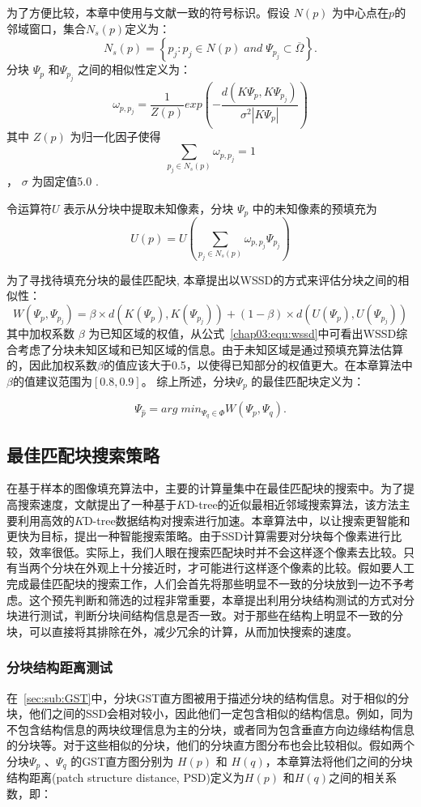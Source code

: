  为了方便比较，本章中使用与文献一致的符号标识。假设 \(N(p)\) 为中心点在\(p\)的邻域窗口，集合\(N_s(p)\)定义为：
 $$N_s(p)= \left\{ p_j:p_j \in N(p)\;and\;\Psi_{p_j} \subset \overline{\Omega} \right\}.$$
 分块 \(\Psi_p\) 和\(\Psi_{p_j}\)  之间的相似性定义为：
 $$\omega_{p,p_{j}}=\frac{1}{Z(p)}exp\left(-\frac{d(K\Psi_p,K\Psi_{p_j})}{\sigma^2\left|K\Psi_p\right|}\right)$$
 其中 \(Z(p)\) 为归一化因子使得 $$\sum_{p_j\in N_s(p)}\omega_{p,p_j} = 1$$ ， \(\sigma\) 为固定值5.0 \cite{Xu:2010}.\par
 令运算符\(U\) 表示从分块中提取未知像素，分块 \(\Psi_p\) 中的未知像素的预填充为
 $$U(p)=U\left(\sum_{p_j \in N_s(p)}{\omega_{p,p_j}\Psi_{p_j}}\right)$$\par
 为了寻找待填充分块的最佳匹配块, 本章提出以WSSD的方式来评估分块之间的相似性：
 \begin{equation}
 W(\Psi_p,\Psi_{p_j})=\beta\times d(K(\Psi_p),K(\Psi_{p_j}))+(1-\beta)\times d(U(\Psi_p),U(\Psi_{p_j}))
 \label{chap03:equ:wssd}
 \end{equation}
 其中加权系数 \(\beta\) 为已知区域的权值，从公式~\ref{chap03:equ:wssd}中可看出WSSD综合考虑了分块未知区域和已知区域的信息。由于未知区域是通过预填充算法估算的，因此加权系数\(\beta\)的值应该大于0.5，以使得已知部分的权值更大。在本章算法中 \(\beta\)的值建议范围为$[0.8, 0.9]$。 综上所述，分块\(\Psi_p\) 的最佳匹配块定义为：


 $$\Psi_{\hat{p}}=arg\;min_{\Psi_q \in \Phi}{W(\Psi_p,\Psi_q)}.$$


 \subsection{最佳匹配块搜索策略}
 在基于样本的图像填充算法中，主要的计算量集中在最佳匹配块的搜索中。为了提高搜索速度，文献\cite{kwokFast}提出了一种基于$K$D-tree的近似最相近邻域搜索算法，该方法主要利用高效的$K$D-tree数据结构对搜索进行加速。本章算法中，以让搜索更智能和更快为目标，提出一种智能搜索策略。由于SSD计算需要对分块每个像素进行比较，效率很低。实际上，我们人眼在搜索匹配块时并不会这样逐个像素去比较。只有当两个分块在外观上十分接近时，才可能进行这样逐个像素的比较。假如要人工完成最佳匹配块的搜索工作，人们会首先将那些明显不一致的分块放到一边不予考虑。这个预先判断和筛选的过程非常重要，本章提出利用分块结构测试的方式对分块进行测试，判断分块间结构信息是否一致。对于那些在结构上明显不一致的分块，可以直接将其排除在外，减少冗余的计算，从而加快搜索的速度。
 \subsubsection{分块结构距离测试}
 \label{sec:subsub:PST}
 在~\ref{sec:sub:GST}中，分块GST直方图被用于描述分块的结构信息。对于相似的分块，他们之间的SSD会相对较小，因此他们一定包含相似的结构信息。例如，同为不包含结构信息的两块纹理信息为主的分块，或者同为包含垂直方向边缘结构信息的分块等。对于这些相似的分块，他们的分块直方图分布也会比较相似。假如两个分块\(\Psi_p\) 、\(\Psi_q\) 的GST直方图分别为 \(H(p)\) 和 \(H(q)\)，本章算法将他们之间的分块结构距离(patch structure distance, PSD)定义为\(H(p)\) 和\(H(q)\)之间的相关系数，即：

